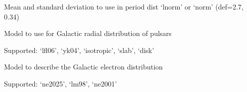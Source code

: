 \documentclass[letterpaper,10pt,english]{sphinxmanual}
\begin{document}

\begin{fulllineitems}
\label{\detokenize{cmd-line-docs:cmdoption-populate.py-p}}
\pysigstartsignatures
\pysigline
{}
\pysigstopsignatures
\sphinxAtStartPar
Mean and standard deviation to use in period dist ‘lnorm’ or ‘norm’ (def=\sphinxhyphen{}2.7, 0.34)

\end{fulllineitems}


\begin{fulllineitems}
\label{\detokenize{cmd-line-docs:cmdoption-populate.py-rdist}}
\pysigstartsignatures
\pysigline
{}
\pysigstopsignatures
\sphinxAtStartPar
Model to use for Galactic radial distribution of pulsars

\sphinxAtStartPar
Supported: ‘lfl06’, ‘yk04’, ‘isotropic’, ‘slab’, ‘disk’

\end{fulllineitems}


\begin{fulllineitems}
\label{\detokenize{cmd-line-docs:cmdoption-populate.py-dm}}
\pysigstartsignatures
\pysigline
{}
\pysigstopsignatures
\sphinxAtStartPar
Model to describe the Galactic electron distribution

\sphinxAtStartPar
Supported: ‘ne2025’, ‘lm98’, ‘ne2001’

\end{fulllineitems}
\end{document}

